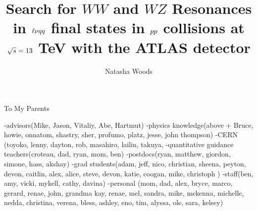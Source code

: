 





\title{Search for $WW$ and $WZ$ Resonances in $\ell\nu \MakeLowercase{qq}$ final states in $\MakeLowercase{pp}$ collisions at $\sqrt{\MakeLowercase{s}}=13$ TeV with the ATLAS detector}
\author{Natasha Woods}
\deanlinethree{}

\begin{frontmatter}
\maketitle

\copyrightpage

\tableofcontents


\listoffigures

\listoftables
\begin{abstract}

\end{abstract}

\begin{dedication}
\vspace*{\fill}
\begin{center}
To My Parents
\end{center}
\vspace*{\fill}
\end{dedication}

\begin{acknowledgements}
-advisors(Mike, Jason, Vitaliy, Abe, Hartmut)
-physics knowledge(above + Bruce, howie, onnatom, shastry, sher, profumo, platz, jesse, john thompson)
-CERN (toyoko, lenny, dayton, rob, masahiro, lailin, takuya, 
-quantitative guidance teachers(croteau, dad, ryan, mom, ben)
-postdocs(ryan, matthew, giordon, simone, hass, akshay)
-grad students(adam, jeff, nico, christian, sheena, peyton, devon, caitlin, alex, alice, steve, devon, katie, coogan, mike, christoph  )
-staff(ben, amy, vicki, mykell, cathy, davina)
-personal (mom, dad, alex, bryce, marco, gerard, renae, john, grandma kay, renae, mel, sandra, mike, mckenna, michelle, nedda, christina, verena, bless, ashley, eno, tim, alyssa, ole, sara, kelsey)

\end{acknowledgements}

\end{frontmatter}
